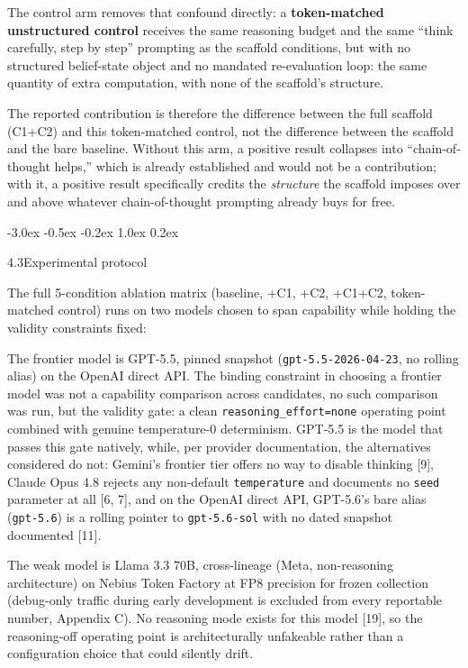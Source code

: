 \documentclass[
  11pt,
]{article}
\makeatletter
\newcounter{none} %
\renewcommand{\subsection}{%
  \@startsection{subsection}{2}{\z@}%
                {-3.0ex \@plus -0.5ex \@minus -0.2ex}%
                { 1.0ex \@plus  0.2ex}%
                {\normalsize\bf\raggedright}%
}
\makeatother
\begin{document}
The control arm removes that confound directly: a \textbf{token-matched unstructured control} receives the same reasoning budget and the same ``think carefully, step by step'' prompting as the scaffold conditions, but with no structured belief-state object and no mandated re-evaluation loop: the same quantity of extra computation, with none of the scaffold's structure.

The reported contribution is therefore the difference between the full scaffold (C1+C2) and this token-matched control, not the difference between the scaffold and the bare baseline. Without this arm, a positive result collapses into ``chain-of-thought helps,'' which is already established and would not be a contribution; with it, a positive result specifically credits the \emph{structure} the scaffold imposes over and above whatever chain-of-thought prompting already buys for free.

\subsection{4.3\quad Experimental protocol}\label{experimental-protocol}

The full 5-condition ablation matrix (baseline, +C1, +C2, +C1+C2, token-matched control) runs on two models chosen to span capability while holding the validity constraints fixed:

The frontier model is GPT-5.5, pinned snapshot (\texttt{gpt-5.5-2026-04-23}, no rolling alias) on the OpenAI direct API. The binding constraint in choosing a frontier model was not a capability comparison across candidates, no such comparison was run, but the validity gate: a clean \texttt{reasoning\_effort=\textquotesingle{}none\textquotesingle{}} operating point combined with genuine temperature-0 determinism. GPT-5.5 is the model that passes this gate natively, while, per provider documentation, the alternatives considered do not: Gemini's frontier tier offers no way to disable thinking {[}9{]}, Claude Opus 4.8 rejects any non-default \texttt{temperature} and documents no \texttt{seed} parameter at all {[}6, 7{]}, and on the OpenAI direct API, GPT-5.6's bare alias (\texttt{gpt-5.6}) is a rolling pointer to \texttt{gpt-5.6-sol} with no dated snapshot documented {[}11{]}.

The weak model is Llama 3.3 70B, cross-lineage (Meta, non-reasoning architecture) on Nebius Token Factory at FP8 precision for frozen collection (debug-only traffic during early development is excluded from every reportable number, Appendix C). No reasoning mode exists for this model {[}19{]}, so the reasoning-off operating point is architecturally unfakeable rather than a configuration choice that could silently drift.
\end{document}
